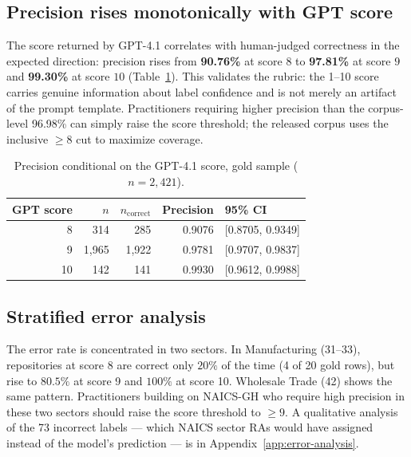 \documentclass{article}
\begin{document}
\begin{table}[ht]
\centering
\caption{Per-sector precision in the gold sample
($n=2{,}421$), sorted descending. Wilson 95\% intervals.}
\label{tab:per-sector-precision}
\small

\end{table}

\subsection{Precision rises monotonically with GPT score}
The score returned by GPT-4.1 correlates with human-judged
correctness in the expected direction: precision rises from
\textbf{90.76\%} at score $8$ to \textbf{97.81\%} at score $9$ and
\textbf{99.30\%} at score $10$ (Table~\ref{tab:precision-by-score}).
This validates the rubric: the 1--10 score carries genuine
information about label confidence and is not merely an artifact of
the prompt template. Practitioners requiring higher precision than
the corpus-level 96.98\% can simply raise the score threshold; the
released corpus uses the inclusive $\geq 8$ cut to maximize coverage.

\begin{table}[ht]
\centering
\caption{Precision conditional on the GPT-4.1 score, gold sample
($n=2{,}421$).}
\label{tab:precision-by-score}
\begin{tabular}{rrrrl}
\toprule
GPT score & $n$ & $n_{\text{correct}}$ & Precision & 95\% CI \\
\midrule
8 & 314 & 285 & 0.9076 & [0.8705, 0.9349] \\
9 & 1{,}965 & 1{,}922 & 0.9781 & [0.9707, 0.9837] \\
10 & 142 & 141 & 0.9930 & [0.9612, 0.9988] \\
\bottomrule
\end{tabular}
\end{table}

\subsection{Stratified error analysis}
The error rate is concentrated in two sectors. In Manufacturing
(31--33), repositories at score 8 are correct only $20\%$ of the time
(4 of 20 gold rows), but rise to $80.5\%$ at score 9 and $100\%$ at
score 10. Wholesale Trade (42) shows the same pattern. Practitioners
building on NAICS-GH who require high precision in these two sectors
should raise the score threshold to $\geq 9$. A qualitative analysis
of the 73 incorrect labels --- which NAICS sector RAs would have
assigned instead of the model's prediction --- is in
Appendix~\ref{app:error-analysis}.
\end{document}
